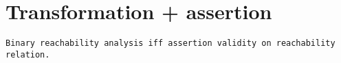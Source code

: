 \section{Transformation + assertion}
\label{sec-trans-assert}

\begin{theorem}[T3]
\begin{verbatim}
Binary reachability analysis iff assertion validity on reachability relation.
\end{verbatim}
\end{theorem}



